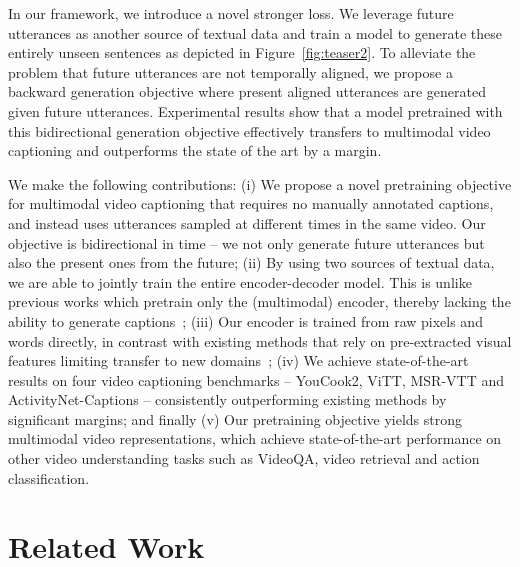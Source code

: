 \documentclass[10pt,twocolumn,letterpaper]{article}
\begin{document}
In our framework, we introduce a novel stronger loss. We leverage future utterances as another source of textual data and train a model to generate these entirely unseen sentences as depicted in Figure~\ref{fig:teaser2}.
To alleviate the problem that future utterances are not temporally aligned,
we propose a
backward generation objective where present aligned utterances are generated given future utterances.
Experimental results show that a model pretrained with this bidirectional generation objective effectively transfers to  multimodal video captioning and outperforms the state of the art by a margin. 



We make the following contributions: 
(i) We propose a novel pretraining objective for multimodal video captioning that requires no manually annotated captions, and instead uses utterances sampled at different times in the same video. Our objective is bidirectional in time -- \ie we not only generate future utterances but also the present ones from the future;
(ii) By using two sources of textual data, we are able to jointly train the entire encoder-decoder model. This is unlike previous works which pretrain only the (multimodal) encoder, thereby lacking the ability to generate captions~\cite{seo2021look,sun2019videobert,li2020hero};
(iii) Our encoder is trained from raw pixels and words directly, in contrast with existing methods that rely on pre-extracted visual features limiting transfer to new domains~\cite{luo2020univl,korbar2020video,huang2020multimodal};
(iv) We achieve state-of-the-art results on four video captioning benchmarks -- YouCook2, ViTT, MSR-VTT and ActivityNet-Captions -- 
consistently outperforming existing methods by significant margins; and finally
(v) Our pretraining objective yields strong multimodal video representations, which achieve state-of-the-art performance on other video understanding tasks such as VideoQA, video retrieval and action classification.
 \section{Related Work}
\end{document}
